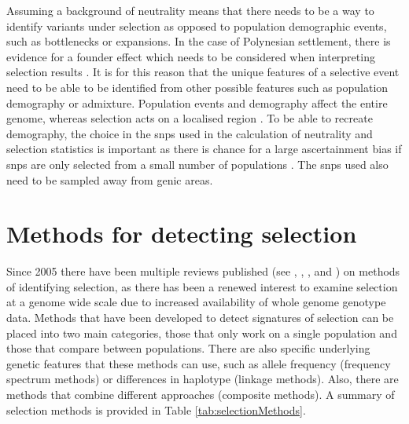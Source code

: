 \documentclass[]{report}
\begin{document}
Assuming a background of neutrality means that there needs to be a way
to identify variants under selection as opposed to population
demographic events, such as bottlenecks or expansions. In the case of
Polynesian settlement, there is evidence for a founder effect which
needs to be considered when interpreting selection results
\citep{Kayser2006a}. It is for this reason that the unique features of a
selective event need to be able to be identified from other possible
features such as population demography or admixture. Population events
and demography affect the entire genome, whereas selection acts on a
localised region \citep{Stajich2005}. To be able to recreate demography,
the choice in the \glspl{snp} used in the calculation of neutrality and
selection statistics is important as there is chance for a large
ascertainment bias if \glspl{snp} are only selected from a small number
of populations \citep{Wall2008}. The \glspl{snp} used also need to be
sampled away from genic areas.

\section{Methods for detecting selection}\label{selMethods}

Since 2005 there have been multiple reviews published (see
\citet{Nielsen2005}, \citet{sabeti2006positive}, \citet{Utsunomiya2015},
\citet{Vitti2013} and \citet{Haasl2016}) on methods of identifying
selection, as there has been a renewed interest to examine selection at
a genome wide scale due to increased availability of whole genome
genotype data. Methods that have been developed to detect signatures of
selection can be placed into two main categories, those that only work
on a single population and those that compare between populations. There
are also specific underlying genetic features that these methods can
use, such as allele frequency (frequency spectrum methods) or
differences in haplotype (linkage methods). Also, there are methods that
combine different approaches (composite methods). A summary of selection
methods is provided in Table \ref{tab:selectionMethods}.
\end{document}
